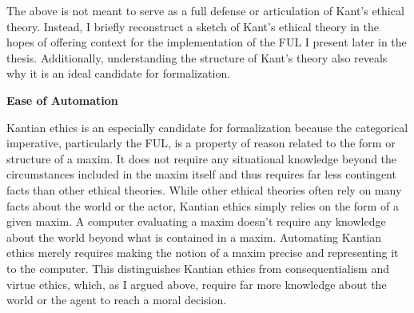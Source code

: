 \begin{isabellebody}
\begin{isamarkuptext}
The above is not meant to serve as a full defense or articulation of Kant's ethical theory. Instead, I briefly reconstruct a sketch of Kant's ethical theory in the hopes 
of offering context for the implementation of the FUL I present later in the thesis. Additionally, understanding 
the structure of Kant's theory also reveals why it is an ideal candidate 
for formalization.%
\end{isamarkuptext}\isamarkuptrue%
%
\begin{isamarkuptext}%
\noindent \textbf{Ease of Automation}%
\end{isamarkuptext}\isamarkuptrue%
%
\begin{isamarkuptext}%
Kantian ethics is an especially candidate for formalization because the categorical imperative, particularly the FUL, 
is a property of reason related to the form or structure of a maxim. It does not require any situational 
knowledge beyond the circumstances included
in the maxim itself and thus requires far less contingent facts than other ethical theories.
While other ethical theories often rely on many facts about 
the world or the actor, Kantian ethics simply relies on the form of a given maxim. A computer evaluating 
a maxim doesn't require any knowledge about the world beyond what is contained in a maxim. Automating 
Kantian ethics merely requires making the notion of a maxim precise and representing it to the computer. 
This distinguishes Kantian ethics from consequentialism and virtue ethics, which, as I argued above, 
require far more knowledge about the world or the agent to reach a moral decision.


\end{isamarkuptext}
\end{isabellebody}
